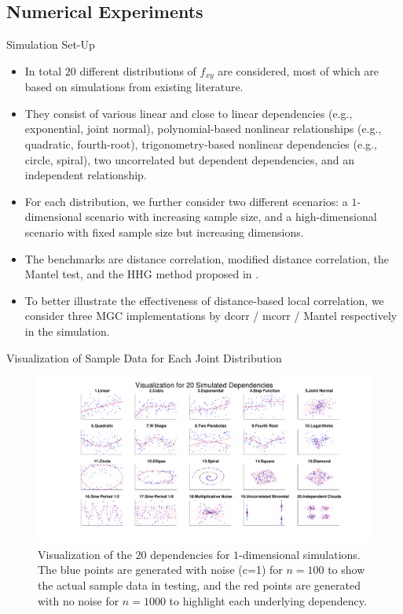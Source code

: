 \documentclass{beamer}
\begin{document}
\subsection{Numerical Experiments}
\begin{frame}{Simulation Set-Up}
\begin{itemize}[<+->]
\item In total $20$ different distributions of $f_{xy}$ are considered, most of which are based on simulations from existing literature.
\item They consist of various linear and close to linear dependencies (e.g., exponential, joint normal), polynomial-based nonlinear relationships (e.g., quadratic, fourth-root), trigonometry-based nonlinear dependencies (e.g., circle, spiral), two uncorrelated but dependent dependencies, and an independent relationship. 
\item For each distribution, we further consider two different scenarios: a $1$-dimensional scenario with increasing sample size, and a high-dimensional scenario with fixed sample size but increasing dimensions.
\item The benchmarks are distance correlation, modified distance correlation, the Mantel test, and the HHG method proposed in \cite{HellerGorfine2013}.
\item To better illustrate the effectiveness of distance-based local correlation, we consider three MGC implementations by dcorr / mcorr / Mantel respectively in the simulation.
\end{itemize}
\end{frame}

\begin{frame}{Visualization of Sample Data for Each Joint Distribution}
\begin{figure}[ht]
  \centering
  \includegraphics[width=1.0\textwidth]{Figures/Fig0}
	\caption{Visualization of the $20$ dependencies for $1$-dimensional simulations. The blue points are generated with noise (c=1) for $n=100$ to show the actual sample data in testing, and the red points are generated with no noise for $n=1000$ to highlight each underlying dependency.}
	\label{fig1}
\end{figure} 
\end{frame}
\end{document}
